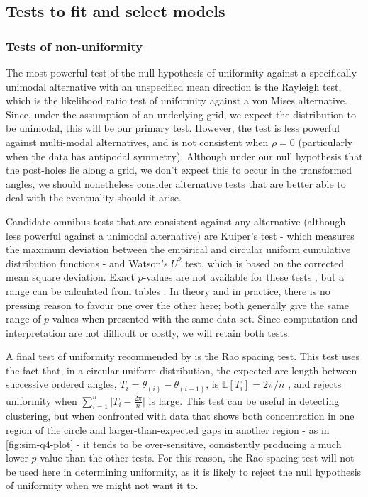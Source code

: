 \documentclass[../../ArchStats.tex]{subfiles}
\begin{document}
\subsection{Tests to fit and select models}
\label{sec:model-fitting-tests}

\subsubsection{Tests of non-uniformity}
\label{sec:unif-tests}

The most powerful test of the null hypothesis of uniformity against a specifically unimodal alternative with an unspecified mean direction is the Rayleigh test, which is the likelihood ratio test of uniformity against a von Mises alternative. Since, under the assumption of an underlying grid, we expect the distribution to be unimodal, this will be our primary test. However, the test is less powerful against multi-modal alternatives, and is not consistent when $\rho = 0$ (particularly when the data has antipodal symmetry). Although under our null hypothesis that the post-holes lie along a grid, we don't expect this to occur in the transformed angles, we should nonetheless consider alternative tests that are better able to deal with the eventuality should it arise.

Candidate omnibus tests that are consistent against any alternative (although less powerful against a unimodal alternative) are Kuiper's test - which measures the maximum deviation between the empirical and circular uniform cumulative distribution functions - and Watson's $U^2$ test, which is based on the corrected mean square deviation. Exact $p$-values are not available for these tests , but a range can be calculated from tables . In theory and in practice, there is no pressing reason to favour one over the other here; both generally give the same range of $p$-values when presented with the same data set. Since computation and interpretation are not difficult or costly, we will retain both tests.

A final test of uniformity recommended by \cite{Pewsey2014} is the Rao spacing test. This test uses the fact that, in a circular uniform distribution, the expected arc length between successive ordered angles, $T_i = \theta_{(i)} - \theta_{(i-1)}$, is 
$\mathbb{E}\left[T_i\right] = 2\pi/n$ , and rejects uniformity when $\sum_{i=1}^n \vert T_i - \frac{2\pi}{n}\vert$ is large. This test can be useful in detecting clustering, but when confronted with data that shows both concentration in one region of the circle and larger-than-expected gaps in another region - as in \ref{fig:sim-q4-plot} - it tends to be over-sensitive, consistently producing a much lower $p$-value than the other tests. For this reason, the Rao spacing test will not be used here in determining uniformity, as it is likely to reject the null hypothesis of uniformity when we might not want it to. 
\end{document}
